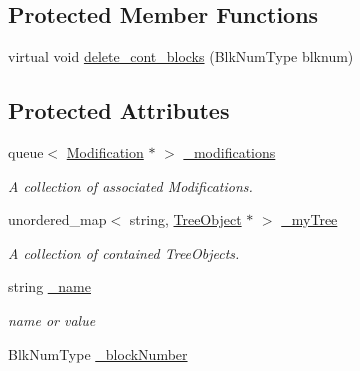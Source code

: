 \subsection*{Protected Member Functions}
\begin{DoxyCompactItemize}
\item 
virtual void \hyperlink{classTreeObject_a07f5f5de1cff0cfdc2372e81559f5181}{delete\+\_\+cont\+\_\+blocks} (Blk\+Num\+Type blknum)
\end{DoxyCompactItemize}
\subsection*{Protected Attributes}
\begin{DoxyCompactItemize}
\item 
queue$<$ \hyperlink{classModification}{Modification} $\ast$ $>$ \hyperlink{classTreeObject_ac285793f5d7cba8069670210606c66c7}{\+\_\+modifications}\hypertarget{classTreeObject_ac285793f5d7cba8069670210606c66c7}{}\label{classTreeObject_ac285793f5d7cba8069670210606c66c7}

\begin{DoxyCompactList}\small\item\em A collection of associated Modifications. \end{DoxyCompactList}\item 
unordered\+\_\+map$<$ string, \hyperlink{classTreeObject}{Tree\+Object} $\ast$ $>$ \hyperlink{classTreeObject_a59effca19a3475c84496c7f82c856d38}{\+\_\+my\+Tree}\hypertarget{classTreeObject_a59effca19a3475c84496c7f82c856d38}{}\label{classTreeObject_a59effca19a3475c84496c7f82c856d38}

\begin{DoxyCompactList}\small\item\em A collection of contained Tree\+Objects. \end{DoxyCompactList}\item 
string \hyperlink{classTreeObject_a368b410ed9b21c7106babf2ba93399b3}{\+\_\+name}\hypertarget{classTreeObject_a368b410ed9b21c7106babf2ba93399b3}{}\label{classTreeObject_a368b410ed9b21c7106babf2ba93399b3}

\begin{DoxyCompactList}\small\item\em name or value \end{DoxyCompactList}\item 
Blk\+Num\+Type \hyperlink{classTreeObject_a17cfa5bde700978b4ec326909362bd2c}{\+\_\+block\+Number}\hypertarget{classTreeObject_a17cfa5bde700978b4ec326909362bd2c}{}\label{classTreeObject_a17cfa5bde700978b4ec326909362bd2c}


\end{DoxyCompactItemize}
